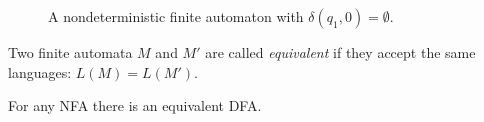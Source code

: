 \begin{page}


\begin{figure}[htb]
\begin{center}

\end{center}
\caption{A nondeterministic finite automaton with $\delta(q_1, 0) = \emptyset$.}
\label{fig:NFABroken}
\end{figure}



\end{page}

\begin{page}

\begin{dfn}
Two finite automata $M$ and $M'$ are called \emph{equivalent} if they accept the same languages: $L(M) = L(M')$.
\end{dfn}

\end{page}

\begin{page}

\begin{thm}
For any NFA there is an equivalent DFA.
\end{thm}

\end{page}

